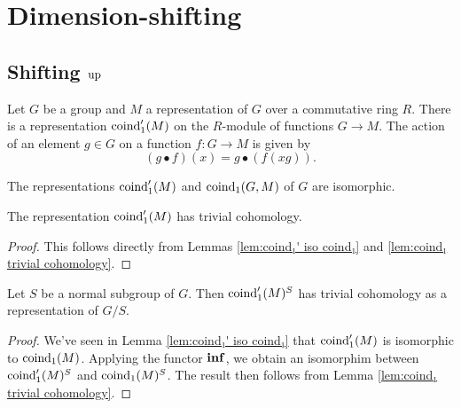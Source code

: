 \section{Dimension-shifting}

\subsection{Shifting $\mathrm{up}$}

\begin{definition} \label{def:coind₁'}
	Let $G$ be a group and $M$ a representation of $G$ over a commutative ring $R$.
	There is a representation $\mathrm{coind}_1' (M)$ on the $R$-module of
	functions $G \to M$.
	The action of an element $g \in G$ on a function $f : G \to M$ is given by
	\[
		(g \bullet f)(x) = g \bullet (f (xg)).
	\]
\end{definition}

\begin{lemma}	\label{lem:coind₁' iso coind₁}
	\leanok
	The representations $\mathrm{coind}_1'(M)$ and $\mathrm{coind}_1(G,M)$ of $G$ are isomorphic.
\end{lemma}

\begin{corollary}	\label{cor:coind₁' trivial cohomology}
	\leanok
	The representation $\mathrm{coind}_1'(M)$ has trivial cohomology.
\end{corollary}

\begin{proof}
	This follows directly from Lemmas \ref{lem:coind₁' iso coind₁}
	and \ref{lem:coind₁ trivial cohomology}.
	\leanok
\end{proof}

\begin{corollary}	\label{cor:coind₁' invariants trivial cohomology}
	Let $S$ be a normal subgroup of $G$. Then $\mathrm{coind}_1'(M)^S$ has trivial cohomology as a
	representation of $G/S$.
\end{corollary}

\begin{proof}
	We've seen in Lemma \ref{lem:coind₁' iso coind₁} that $\mathrm{coind}_1'(M)$
	is isomorphic to $\mathrm{coind}_1(M)$.
	Applying the functor $\mathbf{inf}$, we obtain an isomorphim between $\mathrm{coind}_1'(M)^S$ and $\mathrm{coind}_1(M)^S$.
	The result then follows from Lemma \ref{lem:coind₁ trivial cohomology}.
\end{proof}

